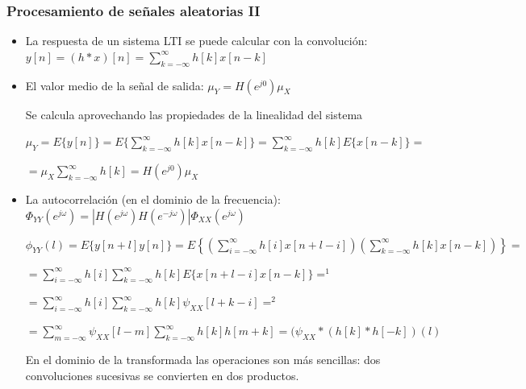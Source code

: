 \documentclass{beamer}
\numberwithin{section}{part}
\begin{document}
\begin{frame}
  \frametitle{Procesamiento de señales aleatorias II}
  \vspace{-0.2cm}
  \footnotesize
  \begin{itemize}
  \item La respuesta de un sistema LTI se puede calcular con la convolución: $y[n]=(h*x)[n]=\sum_{k=-\infty}^{\infty} h[k]x[n-k]$ 
  
  \item El valor medio de la señal de salida:
  \alert{$\mu_Y=H(e^{j0})\mu_X$}
  
  {\scriptsize
  
  \color{gray}
  Se calcula aprovechando las propiedades de la linealidad del sistema
  
  $\mu_Y=E\{y[n]\}=E\{\sum_{k=-\infty}^{\infty} h[k]x[n-k]\}=\sum_{k=-\infty}^{\infty} h[k]E\{x[n-k]\}=$
  
  \hspace{0.8cm}$=\mu_X \sum_{k=-\infty}^{\infty} h[k]=H(e^{j0})\mu_X$
  \color{black}}
  
  \item La autocorrelación (en el dominio de la frecuencia): \alert{$\Phi_{YY}(e^{j\omega})=|H(e^{j\omega})H(e^{-j\omega})|\Phi_{XX}(e^{j\omega})$}
  
  {\scriptsize
  \color{gray}
  
  $\phi_{YY}(l)\!=\!E\{y[n\!+\!l]y[n]\}\!=\!E\!\!\left \{\left ( \sum_{i=-\infty}^{\infty} h[i]x[n\!+\!l\!-\!i] \right )\!\! \left ( \sum_{k=-\infty}^{\infty} h[k]x[n\!-\!k] \right )\right \}=$
  
  \hspace{0.9cm}$=\sum_{i=-\infty}^{\infty} h[i] \sum_{k=-\infty}^{\infty} h[k] E\{x[n\!+\!l\!-\!i]x[n\!-\!k]\}=^1$
  
  \vspace{0.1cm}
  
  \hspace{0.9cm}$=\sum_{i=-\infty}^{\infty} h[i] \sum_{k=-\infty}^{\infty} h[k] \psi_{XX}[l+k-i]=^2$
  
  \vspace{0.1cm}
  
  \hspace{0.9cm}$=\sum_{m=-\infty}^{\infty} \psi_{XX}[l-m] \sum_{k=-\infty}^{\infty} h[k] h[m+k] =(\psi_{XX}*(h[k]*h[-k])(l)$
  
  \vspace{0.1cm}
  
  En el dominio de la transformada las operaciones son más sencillas: dos convoluciones sucesivas se convierten en dos productos.
  
}
\end{itemize}
\end{frame}
\end{document}
